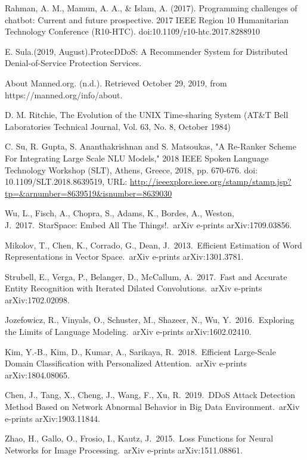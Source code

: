 \begin{thebibliography}{99}
Rahman, A. M., Mamun, A. A., \& Islam, A. (2017). Programming challenges of chatbot: Current and future prospective. 2017 IEEE Region 10 Humanitarian Technology Conference (R10-HTC). doi:10.1109/r10-htc.2017.8288910 

 E. Sula.(2019, August).ProtecDDoS: A Recommender System for Distributed Denial-of-Service Protection Services. 

 About Manned.org. (n.d.). Retrieved October 29, 2019, from https://manned.org/info/about.

 D. M. Ritchie, The Evolution of the UNIX Time-sharing System (AT\&T Bell Laboratories Technical Journal, Vol. 63, No. 8, October 1984)

 C. Su, R. Gupta, S. Ananthakrishnan and S. Matsoukas, "A Re-Ranker Scheme For Integrating Large Scale NLU Models," 2018 IEEE Spoken Language Technology Workshop (SLT), Athens, Greece, 2018, pp. 670-676.
doi: 10.1109/SLT.2018.8639519, URL: \url{http://ieeexplore.ieee.org/stamp/stamp.jsp?tp=&arnumber=8639519&isnumber=8639030}

Wu, L., Fisch, A., Chopra, S., Adams, K., Bordes, A., Weston, J.\ 2017.\ StarSpace: Embed All The Things!.\ arXiv e-prints arXiv:1709.03856.

Mikolov, T., Chen, K., Corrado, G., Dean, J.\ 2013.\ Efficient Estimation of Word Representations in Vector Space.\ arXiv e-prints arXiv:1301.3781.

Strubell, E., Verga, P., Belanger, D., McCallum, A.\ 2017.\ Fast and Accurate Entity Recognition with Iterated Dilated Convolutions.\ arXiv e-prints arXiv:1702.02098.

Jozefowicz, R., Vinyals, O., Schuster, M., Shazeer, N., Wu, Y.\ 2016.\ Exploring the Limits of Language Modeling.\ arXiv e-prints arXiv:1602.02410.

 Kim, Y.-B., Kim, D., Kumar, A., Sarikaya, R.\ 2018.\ Efficient Large-Scale Domain Classification with Personalized Attention.\ arXiv e-prints arXiv:1804.08065.

 Chen, J., Tang, X., Cheng, J., Wang, F., Xu, R.\ 2019.\ DDoS Attack Detection Method Based on Network Abnormal Behavior in Big Data Environment.\ arXiv e-prints arXiv:1903.11844.

 Zhao, H., Gallo, O., Frosio, I., Kautz, J.\ 2015.\ Loss Functions for Neural Networks for Image Processing.\ arXiv e-prints arXiv:1511.08861.


\end{thebibliography}
